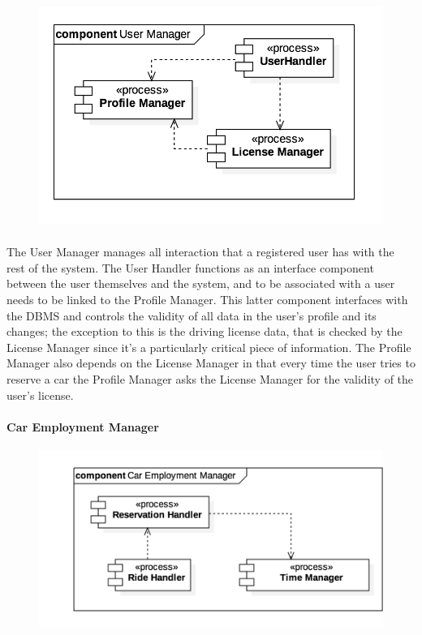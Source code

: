 			\begin{figure}[h]
				\includegraphics[scale=0.4, center]{img/component_diagrams/03_user_manager.png}
			\end{figure}
			
		\paragraph{} The User Manager manages all interaction that a registered user has with the rest of the system. The User Handler functions as an interface component between the user themselves and the system, and to be associated with a user needs to be linked to the Profile Manager. This latter component interfaces with the DBMS and controls the validity of all data in the user's profile and its changes; the exception to this is the driving license data, that is checked by the License Manager since it's a particularly critical piece of information. The Profile Manager also depends on the License Manager in that every time the user tries to reserve a car the Profile Manager asks the License Manager for the validity of the user's license. 
\FloatBarrier

		
		
		\paragraph{Car Employment Manager}
		
			\begin{figure}[h]
				\includegraphics[scale=0.4, center]{img/component_diagrams/04_car_employment_manager.png} %
			\end{figure}
			
